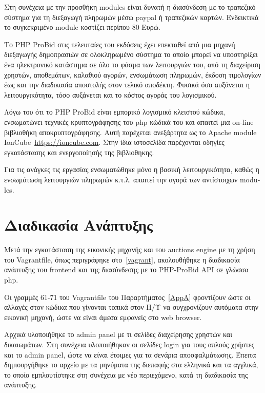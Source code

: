 \documentclass[12pt]{report}
\begin{document}
Στη συνέχεια με την προσθήκη \textlatin{modules} είναι δυνατή η διασύνδεση με το τραπεζικό σύστημα για τη διεξαγωγή πληρωμών μέσω \textlatin{paypal} ή τραπεζικών καρτών. Ενδεικτικά το συγκεκριμένο \textlatin{module} κοστίζει περίπου 80 Ευρώ.

Το \textlatin{PHP ProBid} στις τελευταίες του εκδόσεις έχει επεκταθεί από μια μηχανή διεξαγωγής δημοπρασιών σε ολοκληρωμένο σύστημα το οποίο μπορεί να υποστηρίξει ένα ηλεκτρονικό κατάστημα σε όλο το φάσμα των λειτουργιών του, από τη διαχείριση χρηστών, αποθεμάτων, καλαθιού αγορών, ενσωμάτωση πληρωμών, έκδοση τιμολογίων έως και την διαδικασία αποστολής στον τελικό αποδέκτη. Φυσικά όσο αυξάνεται η λειτουργικότητα, τόσο αυξάνεται και το κόστος αγοράς του λογισμικού.

Λόγω του ότι το \textlatin{PHP ProBid} είναι εμπορικό λογισμικό κλειστού κώδικα, ενσωματώνει τεχνικές κρυπτογράφησης του \textlatin{php} κώδικά του και απαιτεί μια \textlatin{on-line} βιβλιοθήκη αποκρυπτογράφησης. Αυτή παρέχεται ανεξάρτητα ως το \textlatin{Apache module IonCube~\url{https://ioncube.com}}. Στην ίδια ιστοσελίδα παρέχονται οδηγίες εγκατάστασης και ενεργοποίησής της βιβλιοθηκης.

Για τις ανάγκες τις εργασίας ενσωματώθηκε μόνο η βασική λειτουργικότητα, καθώς η ενσωμάτωση λειτουργιών πληρωμών κ.τ.λ. απαιτεί την αγορά των αντίστοιχων \textlatin{modules}.

\section{Διαδικασία Ανάπτυξης}
Μετά την εγκατάσταση της εικονικής μηχανής και του \textlatin{auctions engine} με τη χρήση του \textlatin{Vagrantfile}, όπως περιγράφηκε στο~\ref{vagrant}, ακολουθήθηκε η διαδικασία ανάπτυξης του \textlatin{frontend} και της διασύνδεσης με το \textlatin{PHP-ProBid API} σε γλώσσα \textlatin{php}.

Οι γραμμές 61-71 του \textlatin{Vagrantfile} του Παραρτήματος~\ref{AppA} φροντίζουν ώστε οι αλλαγές στον κώδικα που γίνονται τοπικά στον Η/Υ να συγχρονίζουν αυτόματα στην εικονική μηχανή, ώστε να είναι άμεσα εμφανείς στο \textlatin{web browser}.

Αρχικά υλοποιήθηκε το \textlatin{admin panel} με τι σελίδες διαχείρησης χρηστών και δικαιωμάτων. Στη συνέχεια υλοποιήθηκαν οι σελίδες \textlatin{login} για τους απλούς χρήστες και το \textlatin{admin panel}, ώστε να είναι έτοιμες για τα σενάρια αποσφαλμάτωσης. Έπειτα δημιουργήθηκε το αρχείο με τα μηνύματα της διεπαφής στα ελληνικά και τα αγγλικά, το οποίο εμπλουτίστηκε στη συνέχεια με νέο περιεχόμενο, κατά τη διαδικασία της ανάπτυξης.
\end{document}
